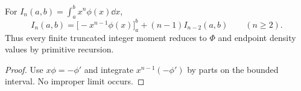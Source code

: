 \begin{proposition}\label{prop:incomplete-moments}
For $I_n(a,b)=\int_a^b x^n\phi(x)\dd x$,
\begin{equation}\label{eq:incomplete-rec}
 I_n(a,b)=\bigl[-x^{n-1}\phi(x)\bigr]_a^b+(n-1)I_{n-2}(a,b)
 \qquad(n\ge2).
\end{equation}
Thus every finite truncated integer moment reduces to $\Phi$ and endpoint density values by primitive recursion.
\end{proposition}

\begin{proof}
Use $x\phi=-\phi'$ and integrate $x^{n-1}(-\phi')$ by parts on the bounded interval.  No improper limit occurs.
\end{proof}
